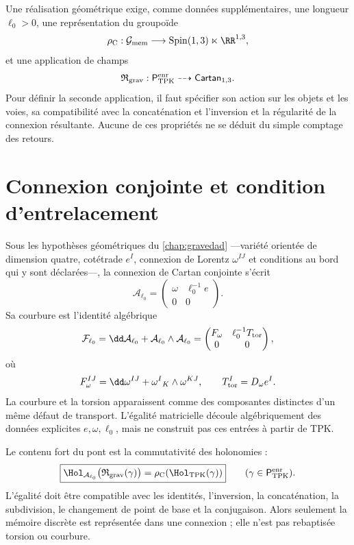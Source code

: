 Une réalisation géométrique exige, comme données supplémentaires, une longueur
\(\ell_0>0\), une représentation du groupoïde
\[
 \rho_{\rm C}:
 \mathcal G_{\rm mem}
 \longrightarrow
 \operatorname{Spin}(1,3)\ltimes\RR^{1,3},
\]
et une application de champs
\[
 \mathfrak R_{\rm grav}:
 \mathsf P_{\rm TPK}^{\rm enr}
 \dashrightarrow
 \mathsf{Cartan}_{1,3}.
\]
Pour définir la seconde application, il faut spécifier son action sur les objets et les
voies, sa compatibilité avec la concaténation et l'inversion et la régularité de la
connexion résultante. Aucune de ces propriétés ne se déduit du simple comptage
des retours.

\section{Connexion conjointe et condition d'entrelacement}
\label{sec:conexion-cartan-conjunta}

Sous les hypothèses géométriques du \cref{chap:gravedad} ---variété
orientée de dimension quatre, cotétrade \(e^I\), connexion de Lorentz
\(\omega^{IJ}\) et conditions au bord qui y sont déclarées---, la connexion de
Cartan conjointe s'écrit
\[
 \mathcal A_{\ell_0}
 =
 \begin{pmatrix}
  \omega&\ell_0^{-1}e\\
  0&0
 \end{pmatrix}.
\]
Sa courbure est l'identité algébrique
\[
 \mathcal F_{\ell_0}
 =\dd\mathcal A_{\ell_0}
  +\mathcal A_{\ell_0}\wedge\mathcal A_{\ell_0}
 =
 \begin{pmatrix}
  F_\omega&\ell_0^{-1}T_{\rm tor}\\
  0&0
 \end{pmatrix},
\]
où
\[
 F_\omega^{IJ}
 =\dd\omega^{IJ}+\omega^I{}_K\wedge\omega^{KJ},
 \qquad
 T_{\rm tor}^{I}=D_\omega e^I.
\]
La courbure et la torsion apparaissent comme des composantes distinctes d'un même défaut
de transport. L'égalité matricielle découle algébriquement des données
explicites \(e,\omega,\ell_0\), mais ne construit pas ces entrées à partir de TPK.

Le contenu fort du pont est la commutativité des holonomies :
\[
 \boxed{
 \Hol_{\mathcal A_{\ell_0}}
 \bigl(\mathfrak R_{\rm grav}(\gamma)\bigr)
 =
 \rho_{\rm C}\!\left(
 \Hol_{\rm TPK}(\gamma)
 \right)}
 \qquad
 (\gamma\in\mathsf P_{\rm TPK}^{\rm enr}).
\]
L'égalité doit être compatible avec les identités, l'inversion, la concaténation,
la subdivision, le changement de point de base et la conjugaison. Alors seulement la mémoire
discrète est représentée dans une connexion ; elle n'est pas rebaptisée
torsion ou courbure.

